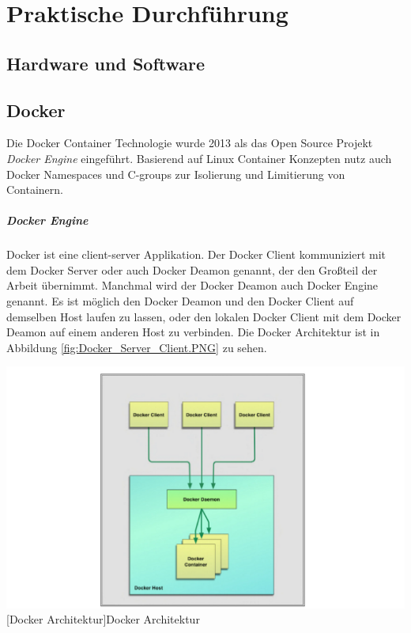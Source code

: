 \thispagestyle{empty}
\section{Praktische Durchführung}
\subsection{Hardware und Software}


\pagebreak
\subsection{Docker}
Die Docker Container Technologie wurde 2013 als das Open Source Projekt \emph{Docker Engine} eingeführt. Basierend auf Linux Container Konzepten nutz auch Docker Namespaces und C-groups zur Isolierung und Limitierung von Containern.  

\subparagraph{Docker Engine}
Docker ist eine client-server Applikation. Der Docker Client kommuniziert mit dem Docker Server oder auch Docker Deamon genannt, der den Großteil der Arbeit übernimmt. Manchmal wird der Docker Deamon auch Docker Engine genannt. Es ist möglich den Docker Deamon und den Docker Client auf demselben Host laufen zu lassen, oder den lokalen Docker Client mit dem Docker Deamon auf einem anderen Host zu verbinden. Die Docker Architektur ist in Abbildung \ref{fig:Docker_Server_Client.PNG} zu sehen\cite{Turnbull2015TheBook}.

\vspace{1em}
\begin{minipage}{\linewidth}
	\centering
	\includegraphics[width=1\linewidth]{pics/Docker_Server_Client.PNG}
	[Docker Architektur\cite{Turnbull2015TheBook}]{Docker Architektur}
	\label{fig:Docker_Server_Client.PNG}
\end{minipage}


